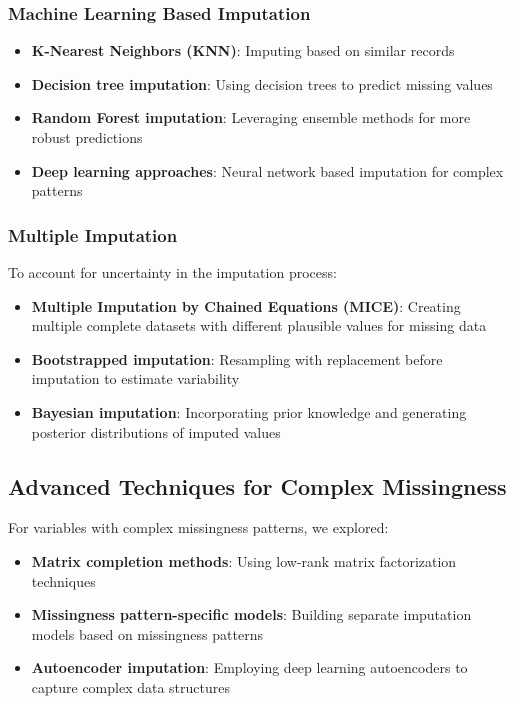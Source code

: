 \subsubsection{Machine Learning Based Imputation}
\begin{itemize}
    \item \textbf{K-Nearest Neighbors (KNN)}: Imputing based on similar records
    \item \textbf{Decision tree imputation}: Using decision trees to predict missing values
    \item \textbf{Random Forest imputation}: Leveraging ensemble methods for more robust predictions
    \item \textbf{Deep learning approaches}: Neural network based imputation for complex patterns
\end{itemize}

\subsubsection{Multiple Imputation}
To account for uncertainty in the imputation process:
\begin{itemize}
    \item \textbf{Multiple Imputation by Chained Equations (MICE)}: Creating multiple complete datasets with different plausible values for missing data
    \item \textbf{Bootstrapped imputation}: Resampling with replacement before imputation to estimate variability
    \item \textbf{Bayesian imputation}: Incorporating prior knowledge and generating posterior distributions of imputed values
\end{itemize}

\subsection{Advanced Techniques for Complex Missingness}
For variables with complex missingness patterns, we explored:
\begin{itemize}
    \item \textbf{Matrix completion methods}: Using low-rank matrix factorization techniques
    \item \textbf{Missingness pattern-specific models}: Building separate imputation models based on missingness patterns
    \item \textbf{Autoencoder imputation}: Employing deep learning autoencoders to capture complex data structures
\end{itemize}

